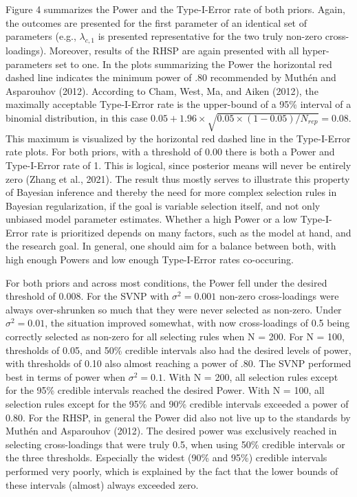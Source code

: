 \documentclass[
  man, donotrepeattitle,floatsintext]{apa6}
\begin{document}
Figure 4 summarizes the Power and the Type-I-Error rate of both priors. Again, the outcomes are presented for the first parameter of an identical set of parameters (e.g., \(\lambda_{c,1}\) is presented representative for the two truly non-zero cross-loadings). Moreover, results of the RHSP are again presented with all hyper-parameters set to one. In the plots summarizing the Power the horizontal red dashed line indicates the minimum power of .80 recommended by Muthén and Asparouhov (2012). According to Cham, West, Ma, and Aiken (2012), the maximally acceptable Type-I-Error rate is the upper-bound of a 95\% interval of a binomial distribution, in this case \(0.05 + 1.96 \times \sqrt{0.05 \times (1-0.05)/ N_{rep}} = 0.08\). This maximum is visualized by the horizontal red dashed line in the Type-I-Error rate plots. For both priors, with a threshold of 0.00 there is both a Power and Type-I-Error rate of 1. This is logical, since posterior means will never be entirely zero (Zhang et al., 2021). The result thus mostly serves to illustrate this property of Bayesian inference and thereby the need for more complex selection rules in Bayesian regularization, if the goal is variable selection itself, and not only unbiased model parameter estimates. Whether a high Power or a low Type-I-Error rate is prioritized depends on many factors, such as the model at hand, and the research goal. In general, one should aim for a balance between both, with high enough Powers and low enough Type-I-Error rates co-occuring.

For both priors and across most conditions, the Power fell under the desired threshold of 0.008. For the SVNP with \(\sigma^2 = 0.001\) non-zero cross-loadings were always over-shrunken so much that they were never selected as non-zero. Under \(\sigma^2 = 0.01\), the situation improved somewhat, with now cross-loadings of 0.5 being correctly selected as non-zero for all selecting rules when N = 200. For N = 100, thresholds of 0.05, and 50\% credible intervals also had the desired levels of power, with thresholds of 0.10 also almost reaching a power of .80. The SVNP performed best in terms of power when \(\sigma^2 = 0.1\). With N = 200, all selection rules except for the 95\% credible intervals reached the desired Power. With N = 100, all selection rules except for the 95\% and 90\% credible intervals exceeded a power of 0.80. For the RHSP, in general the Power did also not live up to the standards by Muthén and Asparouhov (2012). The desired power was exclusively reached in selecting cross-loadings that were truly 0.5, when using 50\% credible intervals or the three thresholds. Especially the widest (90\% and 95\%) credible intervals performed very poorly, which is explained by the fact that the lower bounds of these intervals (almost) always exceeded zero.
\end{document}
